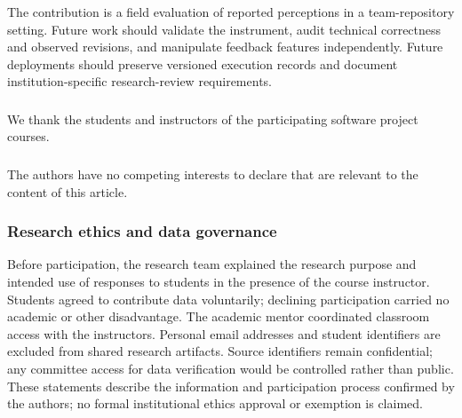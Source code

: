 \documentclass[runningheads]{llncs}
\begin{document}
The contribution is a field evaluation of reported perceptions in a team-repository setting. Future work should validate the instrument, audit technical correctness and observed revisions, and manipulate feedback features independently. Future deployments should preserve versioned execution records and document institution-specific research-review requirements.

\begin{credits}
\subsubsection{\ackname}
We thank the students and instructors of the participating software project courses.

\subsubsection{\discintname}
The authors have no competing interests to declare that are relevant to the content of this article.
\subsubsection{Research ethics and data governance}
Before participation, the research team explained the research purpose and intended use of responses to students in the presence of the course instructor. Students agreed to contribute data voluntarily; declining participation carried no academic or other disadvantage. The academic mentor coordinated classroom access with the instructors. Personal email addresses and student identifiers are excluded from shared research artifacts. Source identifiers remain confidential; any committee access for data verification would be controlled rather than public. These statements describe the information and participation process confirmed by the authors; no formal institutional ethics approval or exemption is claimed.
\end{credits}



\end{document}
